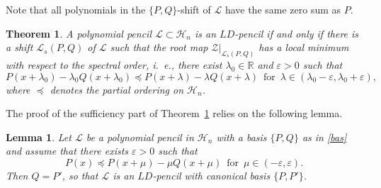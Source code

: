 \documentclass[10pt,twoside,a4paper,reqno]{amsart}
\theoremstyle{plain}
\newtheorem{theo+}           {Theorem}
\newtheorem{lemm+}           {Lemma}
\theoremstyle{definition}
\theoremstyle{remark}
\newenvironment{theorem}{\begin{theo+}}{\end{theo+}}
\newenvironment{lemma}{\begin{lemm+}}{\end{lemm+}}
\newcommand {\bR} {\mathbb {R}}
\newcommand {\la} {\lambda}
\newcommand {\ve} {\varepsilon}
\newcommand {\calL} {\mathcal {L}}
\newcommand {\calH} {\mathcal {H}}
\newcommand {\calZ} {\mathcal {Z}}
\begin{document}
Note that all polynomials in the $\{P,Q\}$-shift of $\calL$  have the same 
zero sum as $P$.

\begin{theorem}\label{locm}
A polynomial pencil $\calL\subset \calH_n$ is an $LD$-pencil if and only if 
there is a shift $\calL_s(P,Q)$ of $\calL$ such that the root map 
$\calZ|_{\calL_s(P,Q)}$ has a local minimum with respect to the spectral 
order, i.~e., there exist $\la_0\in \bR$ and $\ve>0$ such that 
$$P(x+\la_0)-\la_0 Q(x+\la_0)\preccurlyeq P(x+\la)-\la Q(x+\la)\,\text{ for }\,
\la\in (\la_0-\ve,\la_0+\ve),$$
where $\preccurlyeq$ denotes the partial ordering on $\calH_n$.
\end{theorem}

The proof of the sufficiency part of Theorem~\ref{locm} relies on the 
following lemma.

\begin{lemma}\label{suff}
Let $\calL$ be a polynomial pencil in $\calH_n$ with a basis $\{P,Q\}$ as 
in \eqref{bas} and assume that there exists $\ve>0$ such that 
\begin{equation}\label{min}
P(x)\preccurlyeq P(x+\mu)-\mu Q(x+\mu)\,\text{ for }\,\mu\in (-\ve,\ve).
\end{equation}
Then $Q=P'$, so that $\calL$ is an $LD$-pencil with canonical basis $\{P,P'\}$.
\end{lemma}
\end{document}
